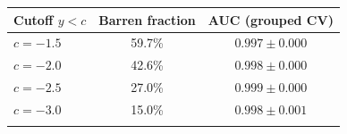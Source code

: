 \begin{tabular}{lcc}
\toprule
Cutoff $y<c$ & Barren fraction & AUC (grouped CV) \\
\midrule
$c=-1.5$ & 59.7\% & $0.997 \pm 0.000$ \\
$c=-2.0$ & 42.6\% & $0.998 \pm 0.000$ \\
$c=-2.5$ & 27.0\% & $0.999 \pm 0.000$ \\
$c=-3.0$ & 15.0\% & $0.998 \pm 0.001$ \\
\botrule
\end{tabular}

